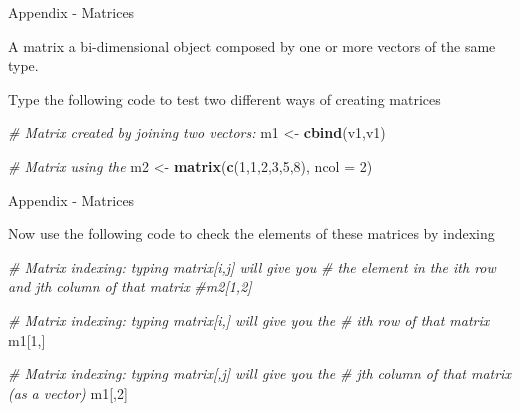 \documentclass[ignorenonframetext,]{beamer}
\newenvironment{Shaded}{\begin{snugshade}}{\end{snugshade}}
\newcommand{\KeywordTok}[1]{\textcolor[rgb]{0.13,0.29,0.53}{\textbf{#1}}}
\newcommand{\DataTypeTok}[1]{\textcolor[rgb]{0.13,0.29,0.53}{#1}}
\newcommand{\DecValTok}[1]{\textcolor[rgb]{0.00,0.00,0.81}{#1}}
\newcommand{\StringTok}[1]{\textcolor[rgb]{0.31,0.60,0.02}{#1}}
\newcommand{\CommentTok}[1]{\textcolor[rgb]{0.56,0.35,0.01}{\textit{#1}}}
\newcommand{\NormalTok}[1]{#1}
\begin{document}
\begin{frame}[fragile]{Appendix - Matrices}

A matrix a bi-dimensional object composed by one or more vectors of the
same type.

\begin{block}{Type the following code to test two different ways of
creating matrices}

\begin{Shaded}
\begin{Highlighting}[]
\CommentTok{# Matrix created by joining two vectors:}
\NormalTok{m1 <-}\StringTok{ }\KeywordTok{cbind}\NormalTok{(v1,v1)}

\CommentTok{# Matrix using the }
\NormalTok{m2 <-}\StringTok{ }\KeywordTok{matrix}\NormalTok{(}\KeywordTok{c}\NormalTok{(}\DecValTok{1}\NormalTok{,}\DecValTok{1}\NormalTok{,}\DecValTok{2}\NormalTok{,}\DecValTok{3}\NormalTok{,}\DecValTok{5}\NormalTok{,}\DecValTok{8}\NormalTok{), }\DataTypeTok{ncol =} \DecValTok{2}\NormalTok{)}
\end{Highlighting}
\end{Shaded}

\end{block}

\end{frame}

\begin{frame}[fragile]{Appendix - Matrices}

\begin{block}{Now use the following code to check the elements of these
matrices by indexing}

\begin{Shaded}
\begin{Highlighting}[]
\CommentTok{# Matrix indexing: typing matrix[i,j] will give you}
\CommentTok{# the element in the ith row and jth column of that matrix}
\CommentTok{#m2[1,2]}

\CommentTok{# Matrix indexing: typing matrix[i,] will give you the}
\CommentTok{# ith row of that matrix}
\NormalTok{m1[}\DecValTok{1}\NormalTok{,]}

\CommentTok{# Matrix indexing: typing matrix[,j] will give you the}
\CommentTok{# jth column of that matrix (as a vector)}
\NormalTok{m1[,}\DecValTok{2}\NormalTok{]}
\end{Highlighting}
\end{Shaded}

\end{block}

\end{frame}
\end{document}
